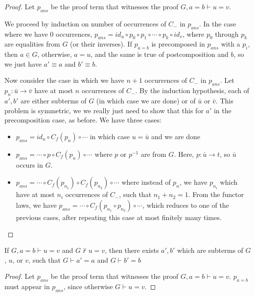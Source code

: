 \begin{proof}
  Let $p_{ans}$ be the proof term that witnesses the proof $G,a=b\vdash u=v$.

  We proceed by induction on number of occurrences of $C_-$ in $p_{ans}$. In the
  case where we have 0 occurrences, $p_{ans} = id_u \circ p_0\circ p_1 \circ \cdots
  \circ p_k \circ id_v$, where $p_0$ through $p_k$ are equalities from $G$ (or their inverses).
  If $p_{a=b}$ is precomposed in $p_{ans}$ with a $p_i$, then $a\in G$, otherwise, $a=u$,
  and the same is true of postcomposition and $b$, so we just have $a'\equiv a$
  and $b'\equiv b$.

  Now consider the case in which we have $n+1$ occurrences of $C_-$ in
  $p_{ans}$. Let $p_n:\bar u\rightarrow \bar v$ have at most $n$ occurrences of $C_-$.
  By the induction hypothesis, each of $a',b'$ are either subterms of $G$ (in
  which case we are done) or of $\bar u$ or $\bar v$. This problem is
  symmetric, we we really just need to show that this for $a'$ in the
  precomposition case, as before. We have three cases:
  \begin{itemize}
    \item $p_{ans} = id_u\circ C_f(p_n)\circ \cdots$ in which case $u=\bar u$ and we are done
    \item $p_{ans} = \cdots \circ p \circ C_f(p_n)\circ \cdots$ where $p$ or
      $p^{-1}$ are from $G$. Here, $p : \bar u \rightarrow t$, so
      $\bar u$ occurs in $G$.
    \item $p_{ans} = \cdots \circ C_f(p_{n_1}) \circ C_f(p_{n_2} )\circ \cdots$
      where instead of $p_n$, we have $p_{n_i}$ which have at most $n_i$
      occurrences of $C_-$, such that $n_1+n_2=1$. From the functor laws, we
      have $p_{ans} = \cdots \circ C_f(p_{n_1}\circ p_{n_2}) \circ \cdots$,
      which reduces to one of the previous cases, after repeating this case at
      most finitely many times.
\end{itemize}
\end{proof}
\begin{corollary}
  If $G,a=b\vdash u=v$ and $G\not\vdash u=v$, then there exists $a',b'$ which
  are subterms of $G$, $u$, or $v$, such that $G\vdash a'=a$ and $G\vdash b'=b$
  \label{cor:subterm-exist}
\end{corollary}
\begin{proof}
  Let $p_{ans}$ be the proof term that witnesses the proof $G,a=b\vdash u=v$.
  $p_{a=b}$ must appear in $p_{ans}$, since otherwise $G\vdash u=v$.
\end{proof}

